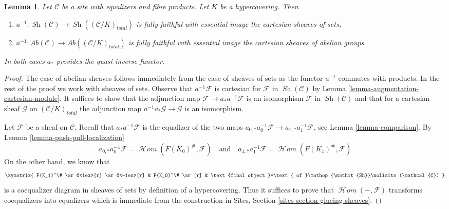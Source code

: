 \documentclass[10pt,a4paper]{amsart}
\theoremstyle{plain}
\newtheorem{lemma}[subsection]{Lemma}
\theoremstyle{definition}
\theoremstyle{remark}
\numberwithin{equation}{subsection}
\def\SheafHom{\mathop{\mathcal{H}\!\mathit{om}}\nolimits}
\def\Sh{\mathop{\mathit{Sh}}\nolimits}
\begin{document}
\begin{lemma}
\label{lemma-hypercovering-descent-sheaves}
Let $\mathcal{C}$ be a site with equalizers and fibre products.
Let $K$ be a hypercovering. Then
\begin{enumerate}
\item $a^{-1} : \Sh(\mathcal{C}) \to \Sh((\mathcal{C}/K)_{total})$
is fully faithful with essential image the cartesian sheaves of sets,
\item $a^{-1} : \textit{Ab}(\mathcal{C}) \to
\textit{Ab}((\mathcal{C}/K)_{total})$
is fully faithful with essential image the cartesian sheaves
of abelian groups.
\end{enumerate}
In both cases $a_*$ provides the quasi-inverse functor.
\end{lemma}

\begin{proof}
The case of abelian sheaves follows immediately from the case
of sheaves of sets as the functor $a^{-1}$ commutes with products.
In the rest of the proof we work with sheaves of sets.
Observe that $a^{-1}\mathcal{F}$ is cartesian for
$\mathcal{F}$ in $\Sh(\mathcal{C})$ by
Lemma \ref{lemma-augmentation-cartesian-module}.
It suffices to show that the adjunction map
$\mathcal{F} \to a_*a^{-1}\mathcal{F}$
is an isomorphism $\mathcal{F}$ in $\Sh(\mathcal{C})$
and that for a cartesian sheaf
$\mathcal{G}$ on $(\mathcal{C}/K)_{total}$
the adjunction map
$a^{-1}a_*\mathcal{G} \to \mathcal{G}$ is an isomorphism.

\medskip\noindent
Let $\mathcal{F}$ be a sheaf on $\mathcal{C}$.
Recall that $a_*a^{-1}\mathcal{F}$ is the equalizer
of the two maps $a_{0, *}a_0^{-1}\mathcal{F} \to a_{1, *}a_1^{-1}\mathcal{F}$,
see Lemma \ref{lemma-comparison}.
By Lemma \ref{lemma-push-pull-localization}
$$
a_{0, *}a_0^{-1}\mathcal{F} = \SheafHom(F(K_0)^\#, \mathcal{F})
\quad\text{and}\quad
a_{1, *}a_1^{-1}\mathcal{F} = \SheafHom(F(K_1)^\#, \mathcal{F})
$$
On the other hand, we know that
$$
\xymatrix{
F(K_1)^\# \ar@<1ex>[r] \ar@<-1ex>[r] &
F(K_0)^\# \ar[r] & \text{final object }*\text{ of }\Sh(\mathcal{C})
}
$$
is a coequalizer diagram in sheaves of sets by definition of
a hypercovering. Thus it suffices to prove
that $\SheafHom(-, \mathcal{F})$ transforms coequalizers
into equalizers which is immediate from the construction
in Sites, Section \ref{sites-section-glueing-sheaves}.


\end{proof}
\end{document}
